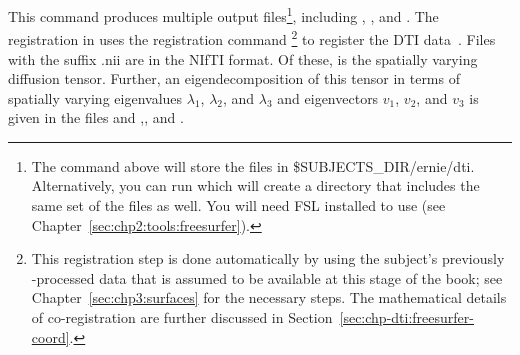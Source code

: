 This command produces multiple output files\footnote{The command above will 
store the files in \$SUBJECTS\_DIR/ernie/dti.  Alternatively, you can run 
 which will create a directory 
 that includes the same set of the files as well. 
You will need FSL installed to use  (see 
Chapter~\ref{sec:chp2:tools:freesurfer}).}, including
, , and . The
registration in  uses the registration command
\footnote{This registration step is done automatically by 
{\freesurfer} using the subject's previously {\freesurfer}-processed data that 
is assumed to be available at this stage of the book; see 
Chapter~\ref{sec:chp3:surfaces} for the necessary steps. The mathematical 
details of co-registration are further discussed in 
Section~\ref{sec:chp-dti:freesurfer-coord}.} to register the DTI
data~\cite{freesurfer-wiki}. Files with the suffix .nii are in the
NIfTI format. Of these,  is the spatially varying
diffusion tensor. Further, an eigendecomposition of this tensor in
terms of spatially varying eigenvalues $\lambda_1$, $\lambda_2$, and 
$\lambda_3$ and eigenvectors $v_1$, $v_2$, and $v_3$ is given in the files
 and ,,
and .


